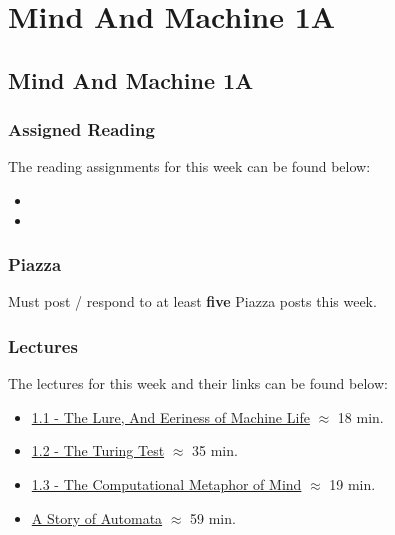 \clearpage

\newcommand{\ChapTitle}{Mind And Machine 1A}
\newcommand{\SectionTitle}{Mind And Machine 1A}

\chapter{\ChapTitle}
\section{\SectionTitle}

\subsection{Assigned Reading}

The reading assignments for this week can be found below:

\begin{itemize}
    \item {}
    \item {}
\end{itemize}

\subsection{Piazza}

Must post / respond to at least \textbf{five} Piazza posts this week.

\subsection{Lectures}

The lectures for this week and their links can be found below:

\begin{itemize}
    \item \href{https://www.youtube.com/watch?v=Ns8VEMUpZtc}{1.1 - The Lure, And Eeriness of Machine Life} $\approx$ 18 min.
    \item \href{https://www.youtube.com/watch?v=FrlctL4vEzo}{1.2 - The Turing Test} $\approx$ 35 min.
    \item \href{https://www.youtube.com/watch?v=WRQ7CwIO030}{1.3 - The Computational Metaphor of Mind} $\approx$ 19 min.
    \item \href{https://www.youtube.com/watch?v=YAg66jrvpHA}{A Story of Automata} $\approx$ 59 min.
\end{itemize}

